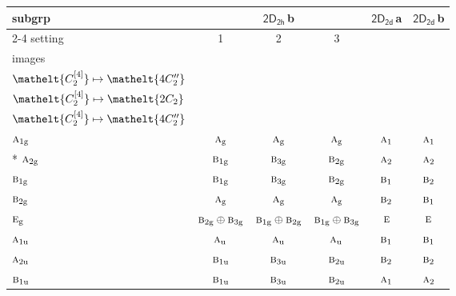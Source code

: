 \documentclass[10pt,a4paper]{article}
\numberwithin{equation}{section}
\newcommand{\eltfont}[1]{{\let\sigma\eltsigma\mathelt{#1}}}
\newcommand{\grp}[1]{\mathsf{#1}}
\newcommand{\irr}[1]{\text{\normalfont\scshape #1}}
\newcommand{\cls}[1]{\eltfont{#1}}
\newcommand{\ptag}[1]{\mathrm{#1}}
\newcommand{\clsletter}[1]{\,{\scriptsize\color{black!55}#1}}
\newcommand{\genidx}[2]{#1^{[\mathrm{#2}]}}
\begin{document}
{\small\begin{longtable}{@{}lccccc@{}}\toprule
subgrp & \multicolumn{3}{c}{\href{2D2h.pdf}{$\grp{2D_{2h}}$}\clsletter{b}} & \href{2D2d.pdf}{$\grp{2D_{2d}}$}\clsletter{a} & \href{2D2d.pdf}{$\grp{2D_{2d}}$}\clsletter{b}\\\cmidrule(lr){2-4}
setting & 1 & 2 & 3 &  & \\
images & {\scriptsize\begin{tabular}[t]{@{}c@{}}$\cls{\genidx{C_{2}}{2}} \mapsto \cls{2C_{2}}$\\$\cls{\genidx{C_{2}}{4}} \mapsto \cls{4C_{2}''}$\end{tabular}} & {\scriptsize\begin{tabular}[t]{@{}c@{}}$\cls{\genidx{C_{2}}{2}} \mapsto \cls{4C_{2}''}$\\$\cls{\genidx{C_{2}}{4}} \mapsto \cls{2C_{2}}$\end{tabular}} & {\scriptsize\begin{tabular}[t]{@{}c@{}}$\cls{\genidx{C_{2}}{2}} \mapsto \cls{4C_{2}''}$\\$\cls{\genidx{C_{2}}{4}} \mapsto \cls{4C_{2}''}$\end{tabular}} &  & \\\midrule\endhead
\bottomrule\endfoot\endlastfoot
$\irr{a}_{1\ptag{g}}$ & $\irr{a}_{\ptag{g}}$ & $\irr{a}_{\ptag{g}}$ & $\irr{a}_{\ptag{g}}$ & $\irr{a}_{1}$ & $\irr{a}_{1}$\\*
$\irr{a}_{2\ptag{g}}$ & $\irr{b}_{1\ptag{g}}$ & $\irr{b}_{3\ptag{g}}$ & $\irr{b}_{2\ptag{g}}$ & $\irr{a}_{2}$ & $\irr{a}_{2}$\\
$\irr{b}_{1\ptag{g}}$ & $\irr{b}_{1\ptag{g}}$ & $\irr{b}_{3\ptag{g}}$ & $\irr{b}_{2\ptag{g}}$ & $\irr{b}_{1}$ & $\irr{b}_{2}$\\
$\irr{b}_{2\ptag{g}}$ & $\irr{a}_{\ptag{g}}$ & $\irr{a}_{\ptag{g}}$ & $\irr{a}_{\ptag{g}}$ & $\irr{b}_{2}$ & $\irr{b}_{1}$\\
$\irr{e}_{\ptag{g}}$ & $\irr{b}_{2\ptag{g}}\oplus \irr{b}_{3\ptag{g}}$ & $\irr{b}_{1\ptag{g}}\oplus \irr{b}_{2\ptag{g}}$ & $\irr{b}_{1\ptag{g}}\oplus \irr{b}_{3\ptag{g}}$ & $\irr{e}$ & $\irr{e}$\\
$\irr{a}_{1\ptag{u}}$ & $\irr{a}_{\ptag{u}}$ & $\irr{a}_{\ptag{u}}$ & $\irr{a}_{\ptag{u}}$ & $\irr{b}_{1}$ & $\irr{b}_{1}$\\
$\irr{a}_{2\ptag{u}}$ & $\irr{b}_{1\ptag{u}}$ & $\irr{b}_{3\ptag{u}}$ & $\irr{b}_{2\ptag{u}}$ & $\irr{b}_{2}$ & $\irr{b}_{2}$\\
$\irr{b}_{1\ptag{u}}$ & $\irr{b}_{1\ptag{u}}$ & $\irr{b}_{3\ptag{u}}$ & $\irr{b}_{2\ptag{u}}$ & $\irr{a}_{1}$ & $\irr{a}_{2}$\\

\end{longtable}}
\end{document}

